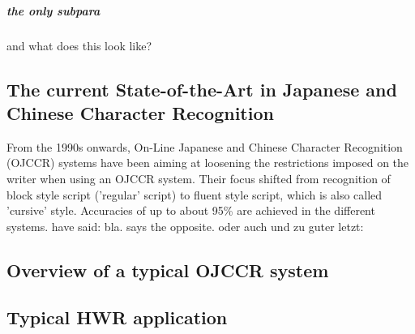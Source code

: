 \subparagraph{the only subpara}

and what does this look like?

\subsection{The current State-of-the-Art in Japanese and Chinese Character Recognition}
From the 1990s onwards, On-Line Japanese and Chinese Character Recognition 
(OJCCR) systems have been aiming at loosening the restrictions imposed on 
the writer when using an OJCCR system. Their focus shifted from recognition 
of block style script ('regular' script) to fluent style script, 
which is also called 'cursive' style. Accuracies of up to about 95\% are
achieved in the different systems. \cite{LiuJaegerNakagawa2004} have said: 
bla.  says the opposite. \cite{ChenLee1996} oder auch 
\cite{Nakagawa2008} und \cite{Nakai2003} zu guter letzt: \cite{Santosh2009}

\subsection{Overview of a typical OJCCR system}

\subsection{Typical HWR application}

